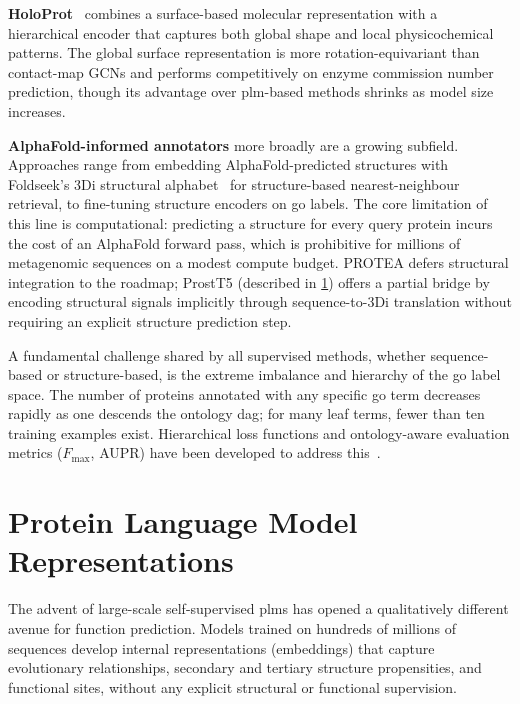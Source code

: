 \textbf{HoloProt}~\cite{somnath2021holoprot} combines a surface-based molecular
representation with a hierarchical encoder that captures both global shape and
local physicochemical patterns. The global surface representation is more
rotation-equivariant than contact-map GCNs and performs competitively on
enzyme commission number prediction, though its advantage over \gls{plm}-based methods
shrinks as model size increases.

\textbf{AlphaFold-informed annotators} more broadly are a growing subfield.
Approaches range from embedding AlphaFold-predicted structures with Foldseek's
3Di structural alphabet~\cite{vankempen2024foldseek} for structure-based
nearest-neighbour retrieval, to fine-tuning structure encoders on \gls{go} labels.
The core limitation of this line is computational: predicting a structure for
every query protein incurs the cost of an AlphaFold forward pass, which is
prohibitive for millions of metagenomic sequences on a modest compute budget.
PROTEA defers structural integration to the roadmap; ProstT5 (described in
\cref{sec:related-plm}) offers a partial bridge by encoding structural signals
implicitly through sequence-to-3Di translation without requiring an explicit
structure prediction step.

A fundamental challenge shared by all supervised methods, whether sequence-based
or structure-based, is the extreme imbalance and hierarchy of the \gls{go} label
space. The number of proteins annotated with any specific \gls{go} term decreases
rapidly as one descends the ontology \gls{dag}; for many leaf terms, fewer than ten
training examples exist. Hierarchical loss functions and ontology-aware evaluation
metrics ($F_{\max}$, AUPR) have been developed to address
this~\cite{clark2013information}.

\section{Protein Language Model Representations}
\label{sec:related-plm}

The advent of large-scale self-supervised \glspl{plm} has opened a qualitatively
different avenue for function prediction. Models trained on hundreds of millions
of sequences develop internal representations (embeddings) that capture
evolutionary relationships, secondary and tertiary structure propensities, and
functional sites, without any explicit structural or functional supervision.

